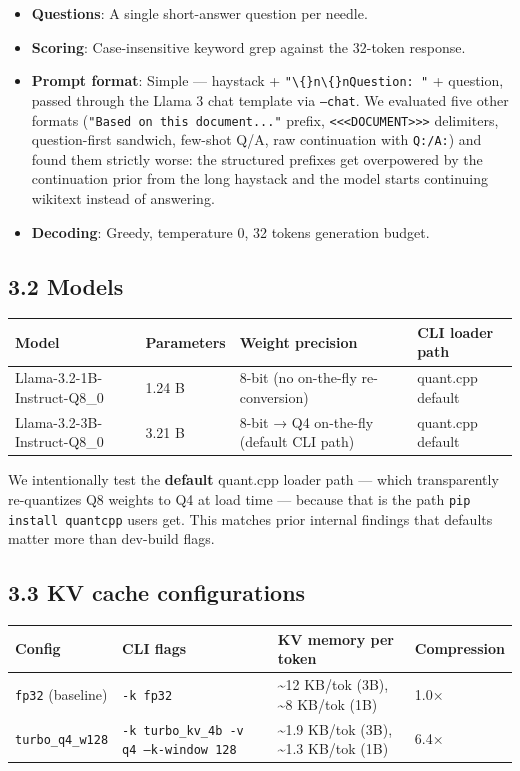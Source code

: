 \documentclass[11pt]{article}
\begin{document}
\begin{itemize}
\item \textbf{Questions}: A single short-answer question per needle.
\item \textbf{Scoring}: Case-insensitive keyword grep against the 32-token response.
\item \textbf{Prompt format}: Simple — haystack + \texttt{"\textbackslash\{\}n\textbackslash\{\}nQuestion: "} + question, passed through the Llama 3 chat template via \texttt{--chat}. We evaluated five other formats (\texttt{"Based on this document..."} prefix, \texttt{<<<DOCUMENT>>>} delimiters, question-first sandwich, few-shot Q/A, raw continuation with \texttt{Q:/A:}) and found them strictly worse: the structured prefixes get overpowered by the continuation prior from the long haystack and the model starts continuing wikitext instead of answering.
\item \textbf{Decoding}: Greedy, temperature 0, 32 tokens generation budget.
\end{itemize}


\subsection*{3.2 Models}


\begin{center}
\begin{tabular}{llll}
\toprule
Model & Parameters & Weight precision & CLI loader path \\
\midrule
Llama-3.2-1B-Instruct-Q8\_0 & 1.24 B & 8-bit (no on-the-fly re-conversion) & quant.cpp default \\
Llama-3.2-3B-Instruct-Q8\_0 & 3.21 B & 8-bit → Q4 on-the-fly (default CLI path) & quant.cpp default \\
\bottomrule
\end{tabular}
\end{center}


We intentionally test the \textbf{default} quant.cpp loader path — which transparently re-quantizes Q8 weights to Q4 at load time — because that is the path \texttt{pip install quantcpp} users get. This matches prior internal findings that defaults matter more than dev-build flags.


\subsection*{3.3 KV cache configurations}


\begin{center}
\begin{tabular}{llll}
\toprule
Config & CLI flags & KV memory per token & Compression \\
\midrule
\texttt{fp32} (baseline) & \texttt{-k fp32} & \textasciitilde{}12 KB/tok (3B), \textasciitilde{}8 KB/tok (1B) & 1.0× \\
\texttt{turbo\_q4\_w128} & \texttt{-k turbo\_kv\_4b -v q4 --k-window 128} & \textasciitilde{}1.9 KB/tok (3B), \textasciitilde{}1.3 KB/tok (1B) & 6.4× \\
\bottomrule
\end{tabular}
\end{center}
\end{document}
